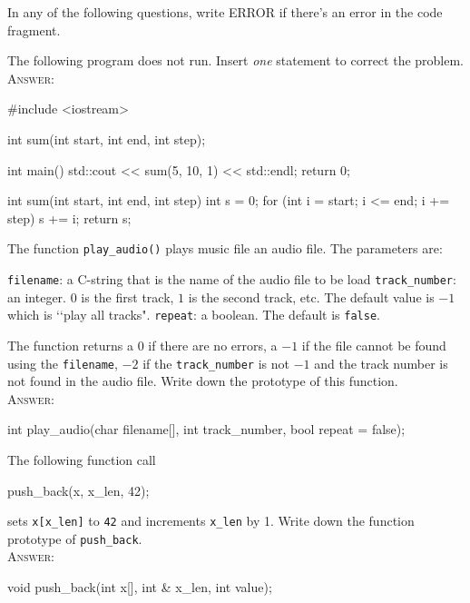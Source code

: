 

\renewcommand\AUTHOR{jdoe5@cougars.ccis.edu} %


\topmattertwo


In any of the following questions, write ERROR if there's
an error in the code fragment.

\nextq
The following program does not run.
Insert \textit{one} statement to correct the problem.
\\
\textsc{Answer:}\vspace{-2mm}
\begin{answercode}
#include <iostream>

int sum(int start, int end, int step);

int main()
{
    std::cout << sum(5, 10, 1) << std::endl;
    return 0;
}

int sum(int start, int end, int step)
{
    int s = 0;
    for (int i = start; i <= end; i += step)
    {
        s += i;
    }
    return s;
}
\end{answercode}

\nextq
The function \verb!play_audio()! plays music file an audio file. The parameters are:
\begin{enumerate}[nosep]
\li \verb!filename!: a C-string that is the name of the audio file to be load
\li \verb!track_number!: an integer.
$0$ is the first track, $1$ is the second track, etc.
The default value is $-1$ which is \lq\lq play all tracks".
\li \verb!repeat!: a boolean. The default is \verb!false!.
\end{enumerate}
The function returns a $0$ if there are no errors,
a $-1$ if the file cannot be found using the \verb!filename!,
$-2$ if the \verb!track_number! is not $-1$ and the track number is not found
in the audio file.
Write down the prototype of this function.
\\
\textsc{Answer:}\vspace{-2mm}
\begin{answercode}
int play_audio(char filename[], int track_number, bool repeat = false);
\end{answercode}

\nextq
The following function call
\begin{console}
push_back(x, x_len, 42);
\end{console}
sets \verb!x[x_len]! to \verb!42! and increments \verb!x_len! by 1.
Write down the function prototype of \verb!push_back!.
\\
\textsc{Answer:}\vspace{-2mm}
\begin{answercode}
void push_back(int x[], int & x_len, int value);
\end{answercode}

\newpage

